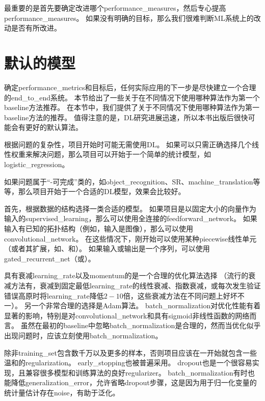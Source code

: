 最重要的是首先要确定改进哪个\gls{performance_measures}，然后专心提高\gls{performance_measures}。
如果没有明确的目标，那么我们很难判断\gls{ML}系统上的改动是否有所改进。


\section{默认的模型}
\label{sec:default_baseline_models}
确定\gls{performance_metrics}和目标后，任何实际应用的下一步是尽快建立一个合理的\gls{end_to_end}系统。
本节给出了一些关于在不同情况下使用哪种算法作为第一个\gls{baseline}方法推荐。
在本节中，我们提供了关于不同情况下使用哪种算法作为第一\gls{baseline}方法的推荐。
值得注意的是，\gls{DL}研究进展迅速，所以本书出版后很快可能会有更好的默认算法。

根据问题的复杂性，项目开始时可能无需使用\gls{DL}。
如果可以只需正确选择几个线性权重来解决问题，那么项目可以开始于一个简单的统计模型，如\gls{logistic_regression}。


如果问题属于``-可完成''类的，如\gls{object_recognition}、\gls{SR}、\gls{machine_translation}等等，那么项目开始于一个合适的\gls{DL}模型，效果会比较好。


首先，根据数据的结构选择一类合适的模型。
如果项目是以固定大小的向量作为输入的\gls{supervised_learning}，那么可以使用全连接的\gls{feedforward_network}。
如果输入有已知的拓扑结构（例如，输入是图像），那么可以使用\gls{convolutional_network}。
在这些情况下，刚开始可以使用某种\gls{piecewise}线性单元（或者其扩展，如、和）。
如果输入或输出是一个序列，可以使用\gls{gated_recurrent_net}（或）。

具有衰减\gls{learning_rate}以及\gls{momentum}的是一个合理的优化算法选择
（流行的衰减方法有，衰减到固定最低\gls{learning_rate}的线性衰减、指数衰减，或每次发生验证错误高原时将\gls{learning_rate}降低$2-10$倍，这些衰减方法在不同问题上好坏不一）。
另一个非常合理的选择是Adam算法。
\gls{batch_normalization}对优化性能有着显著的影响，特别是对\gls{convolutional_network}和具有\gls{sigmoid}非线性函数的网络而言。
虽然在最初的\gls{baseline}中忽略\gls{batch_normalization}是合理的，然而当优化似乎出现问题时，应该立刻使用\gls{batch_normalization}。


除非\gls{training_set}包含数千万以及更多的样本，否则项目应该在一开始就包含一些温和的\gls{regularization}。 
\gls{early_stopping}也被普遍采用。
\gls{dropout}也是一个很容易实现，且兼容很多模型和训练算法的良好\gls{regularizer}。
\gls{batch_normalization}有时也能降低\gls{generalization_error}，允许省略\gls{dropout}步骤，这是因为用于归一化变量的统计量估计存在\gls{noise}，有助于泛化。 %


